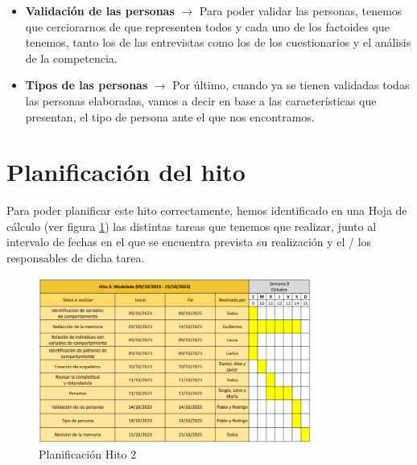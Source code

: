\begin{itemize}
    \item \textbf{Validación de las personas} $\rightarrow$ Para poder validar las personas, tenemos que cerciorarnos de que representen todos y cada uno de los factoides que tenemos, tanto los de las entrevistas como los de los cuestionarios y el análisis de la competencia.
    \item \textbf{Tipos de las personas} $\rightarrow$ Por último, cuando ya se tienen validadas todas las personas elaboradas, vamos a decir en base a las características que presentan, el tipo de persona ante el que nos encontramos.
\end{itemize}

\section{Planificación del hito}
Para poder planificar este hito correctamente, hemos identificado en una Hoja de cálculo (ver figura \ref{fig:planif-hito2}) las distintas tareas que tenemos que 
realizar, junto al intervalo de fechas en el que se encuentra prevista su realización y el / los responsables de dicha tarea.
\begin{figure}[H]
    \centering 
    \includegraphics[width=0.8\textwidth]{./Imagenes/Planificaciones/Planif-hito2.png}
    \caption{Planificación Hito 2}
    \label{fig:planif-hito2}
\end{figure}

